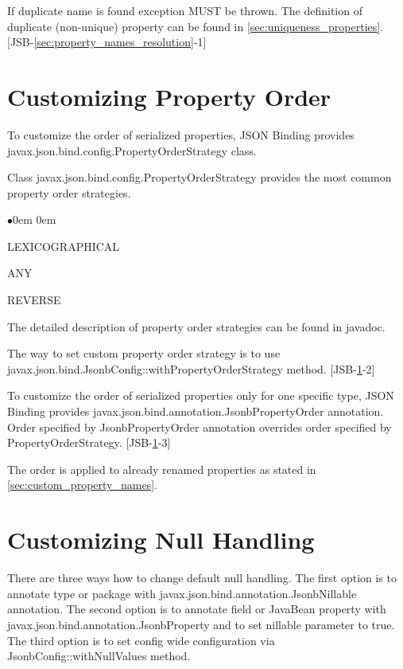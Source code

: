 If duplicate name is found exception MUST be thrown.
The definition of duplicate (non-unique) property can be found in \ref{sec:uniqueness_properties}. [JSB-\ref{sec:property_names_resolution}-1]


\section{Customizing Property Order}
\label{sec:custom_property_order}

To customize the order of serialized properties, JSON Binding provides javax.json.bind.config.PropertyOrderStrategy class.

Class javax.json.bind.config.PropertyOrderStrategy provides the most common property order strategies.

\begin{list}{$\bullet$}{\parsep 0em  0em}
\item LEXICOGRAPHICAL
\item ANY
\item REVERSE
\end{list}

The detailed description of property order strategies can be found in javadoc.

The way to set custom property order strategy is to use javax.json.bind.JsonbConfig::withPropertyOrderStrategy method. [JSB-\ref{sec:custom_property_order}-2]

To customize the order of serialized properties only for one specific type, JSON Binding provides javax.json.bind.annotation.JsonbPropertyOrder annotation. Order specified by JsonbPropertyOrder annotation overrides order specified by PropertyOrderStrategy. [JSB-\ref{sec:custom_property_order}-3]

The order is applied to already renamed properties as stated in \ref{sec:custom_property_names}.

\section{Customizing Null Handling}
\label{sec:custom_null_handling}

There are three ways how to change default null handling. The first option is to annotate type or package with javax.json.bind.annotation.JsonbNillable annotation. The second option is to annotate field or JavaBean property with javax.json.bind.annotation.JsonbProperty and to set nillable parameter to true. The third option is to set config wide configuration via JsonbConfig::withNullValues method.

